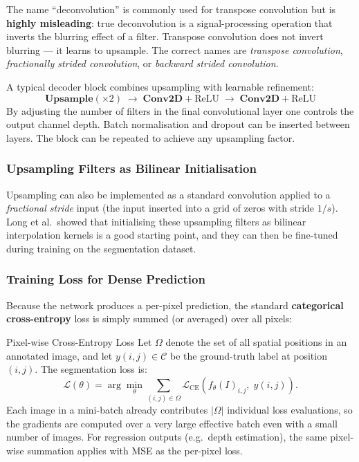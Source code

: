 \documentclass[11pt,a4paper]{article}
\newcommand{\term}[1]{\textcolor{DefGreen}{\textbf{#1}}}
\begin{document}
\begin{notebox}
The name ``deconvolution'' is commonly used for transpose convolution but is \textbf{highly misleading}: true deconvolution is a signal-processing operation that inverts the blurring effect of a filter. Transpose convolution does not invert blurring — it learns to upsample. The correct names are \emph{transpose convolution}, \emph{fractionally strided convolution}, or \emph{backward strided convolution}.
\end{notebox}

A typical decoder block combines upsampling with learnable refinement:
\[
  \textbf{Upsample}({\times}2) \;\to\; \textbf{Conv2D} + \text{ReLU} \;\to\; \textbf{Conv2D} + \text{ReLU}
\]
By adjusting the number of filters in the final convolutional layer one controls the output channel depth. Batch normalisation and dropout can be inserted between layers. The block can be repeated to achieve any upsampling factor.

\subsubsection{Upsampling Filters as Bilinear Initialisation}

Upsampling can also be implemented as a standard convolution applied to a \emph{fractional stride} input (the input inserted into a grid of zeros with stride $1/s$). Long et al.\ showed that initialising these upsampling filters as bilinear interpolation kernels is a good starting point, and they can then be fine-tuned during training on the segmentation dataset.

\subsubsection{Training Loss for Dense Prediction}

Because the network produces a per-pixel prediction, the standard \term{categorical cross-entropy} loss is simply summed (or averaged) over all pixels:

\begin{defbox}{Pixel-wise Cross-Entropy Loss}
Let $\Omega$ denote the set of all spatial positions in an annotated image, and let $y(i,j) \in \mathcal{C}$ be the ground-truth label at position $(i,j)$. The segmentation loss is:
\[
  \mathcal{L}(\theta) = \arg\min_\theta \sum_{(i,j)\in\Omega} \mathcal{L}_{\text{CE}}\!\left(f_\theta(I)_{i,j},\; y(i,j)\right).
\]
Each image in a mini-batch already contributes $|\Omega|$ individual loss evaluations, so the gradients are computed over a very large effective batch even with a small number of images. For regression outputs (e.g.\ depth estimation), the same pixel-wise summation applies with MSE as the per-pixel loss.
\end{defbox}
\end{document}
